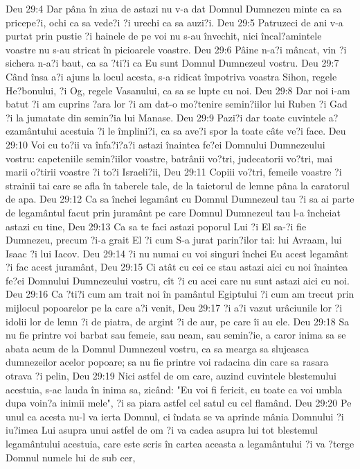Deu 29:4  Dar pâna în ziua de astazi nu v-a dat Domnul Dumnezeu minte ca sa pricepe?i, ochi ca sa vede?i ?i urechi ca sa auzi?i.
Deu 29:5  Patruzeci de ani v-a purtat prin pustie ?i hainele de pe voi nu s-au învechit, nici încal?amintele voastre nu s-au stricat în picioarele voastre.
Deu 29:6  Pâine n-a?i mâncat, vin ?i sichera n-a?i baut, ca sa ?ti?i ca Eu sunt Domnul Dumnezeul vostru.
Deu 29:7  Când însa a?i ajuns la locul acesta, s-a ridicat împotriva voastra Sihon, regele He?bonului, ?i Og, regele Vasanului, ca sa se lupte cu noi.
Deu 29:8  Dar noi i-am batut ?i am cuprins ?ara lor ?i am dat-o mo?tenire semin?iilor lui Ruben ?i Gad ?i la jumatate din semin?ia lui Manase.
Deu 29:9  Pazi?i dar toate cuvintele a?ezamântului acestuia ?i le împlini?i, ca sa ave?i spor la toate câte ve?i face.
Deu 29:10  Voi cu to?ii va înfa?i?a?i astazi înaintea fe?ei Domnului Dumnezeului vostru: capeteniile semin?iilor voastre, batrânii vo?tri, judecatorii vo?tri, mai marii o?tirii voastre ?i to?i Israeli?ii,
Deu 29:11  Copiii vo?tri, femeile voastre ?i strainii tai care se afla în taberele tale, de la taietorul de lemne pâna la caratorul de apa.
Deu 29:12  Ca sa închei legamânt cu Domnul Dumnezeul tau ?i sa ai parte de legamântul facut prin juramânt pe care Domnul Dumnezeul tau l-a încheiat astazi cu tine,
Deu 29:13  Ca sa te faci astazi poporul Lui ?i El sa-?i fie Dumnezeu, precum ?i-a grait El ?i cum S-a jurat parin?ilor tai: lui Avraam, lui Isaac ?i lui Iacov.
Deu 29:14  ?i nu numai cu voi singuri închei Eu acest legamânt ?i fac acest juramânt,
Deu 29:15  Ci atât cu cei ce stau astazi aici cu noi înaintea fe?ei Domnului Dumnezeului vostru, cît ?i cu acei care nu sunt astazi aici cu noi.
Deu 29:16  Ca ?ti?i cum am trait noi în pamântul Egiptului ?i cum am trecut prin mijlocul popoarelor pe la care a?i venit,
Deu 29:17  ?i a?i vazut urâciunile lor ?i idolii lor de lemn ?i de piatra, de argint ?i de aur, pe care îi au ele.
Deu 29:18  Sa nu fie printre voi barbat sau femeie, sau neam, sau semin?ie, a caror inima sa se abata acum de la Domnul Dumnezeul vostru, ca sa mearga sa slujeasca dumnezeilor acelor popoare; sa nu fie printre voi radacina din care sa rasara otrava ?i pelin,
Deu 29:19  Nici astfel de om care, auzind cuvintele blestemului acestuia, s-ac lauda în inima sa, zicând: "Eu voi fi fericit, cu toate ca voi umbla dupa voin?a inimii mele", ?i sa piara astfel cel satul cu cel flamând.
Deu 29:20  Pe unul ca acesta nu-l va ierta Domnul, ci îndata se va aprinde mânia Domnului ?i iu?imea Lui asupra unui astfel de om ?i va cadea asupra lui tot blestemul legamântului acestuia, care este scris în cartea aceasta a legamântului ?i va ?terge Domnul numele lui de sub cer,

